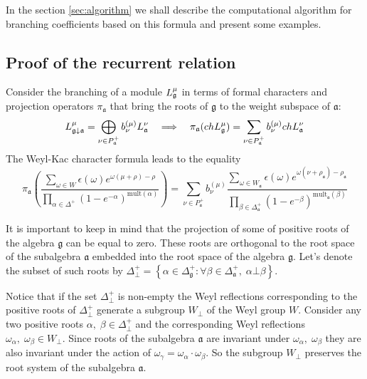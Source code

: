 \documentclass[a4paper,12pt]{article}
\theoremstyle{definition} \newtheorem{Def}{Definition}
\begin{document}
In the section \ref{sec:algorithm} we  shall describe the  computational algorithm for  branching coefficients
based on this formula and present some examples.

\subsection{Proof of the recurrent relation}
\label{sec:proof}

Consider the branching of a module $L_{\frak{g}}^{\mu }$ in terms of formal characters and
projection operators $\pi_{\mathfrak{a}}$ that bring the roots of $\mathfrak{g}$ to the
weight subspace of $\mathfrak{a}$:
\begin{equation}
  \label{eq:3}
  L_{\frak{g}\downarrow \frak{a}}^{\mu }=\bigoplus\limits_{\nu \in P_{\frak{a}%
    }^{+}}b_{\nu }^{\left( \mu \right) }L_{\frak{a}}^{\nu }\quad
  \Longrightarrow\quad
  \pi_{\mathfrak{a}}(ch L^{\mu}_{\mathfrak{g}})=
  \sum_{\nu\in P^{+}_{\mathfrak{a}}}b^{(\mu)}_{\nu} ch L^{\nu}_{\mathfrak{a}}
\end{equation}
The Weyl-Kac character formula leads to
the equality
\begin{equation}
  \label{eq:4}
  \pi_{\mathfrak{a}}\left(\frac{\sum_{\omega\in W} \epsilon(\omega) e^{\omega(\mu+\rho)-\rho}}
  {\prod_{\alpha\in\Delta^{+}}(1-e^{-\alpha})^{\mathrm{mult}(\alpha)}}\right) =
  \sum_{\nu\in P^{+}_{\mathfrak{a}}}b^{(\mu)}_{\nu}
  \frac{\sum_{\omega\in W_{\mathfrak{a}}}\epsilon(\omega)
  e^{\omega(\nu+\rho_{\mathfrak{a}})-\rho_{\mathfrak{a}}}}
  {\prod_{\beta\in \Delta_{\mathfrak{a}}^{+}}(1-e^{-\beta})^{\mathrm{mult}_{\mathfrak{a}}(\beta)}}
\end{equation}

It is important to keep in mind that the projection of some of positive roots of
the algebra $\mathfrak{g}$ can be equal to zero. These roots are orthogonal to the
root space of the subalgebra $\mathfrak{a}$ embedded into the root space of the
algebra $\mathfrak{g}$. Let's denote the subset of such roots by $\Delta^{+}_{\bot}
=\left\{\alpha\in\Delta_{\mathfrak{g}}^{+}:
\forall \beta\in \Delta_{\mathfrak{a}}^{+},\; \alpha\bot\beta \right\}$.

Notice that if the set $\Delta^{+}_{\bot}$ is non-empty the Weyl reflections
corresponding to the positive roots of $\Delta^{+}_{\bot}$ generate a subgroup
$W_{\bot}$ of the Weyl group $W$. Consider any two positive roots $\alpha,\;
\beta\in \Delta^{+}_{\bot}$ and the corresponding Weyl reflections
$\omega_{\alpha},\; \omega_{\beta}\in W_{\bot}$.  Since roots of the subalgebra
$\mathfrak{a}$ are invariant under $\omega_{\alpha}, \; \omega_{\beta}$ they
are also invariant under the action of $\omega_{\gamma}=\omega_{\alpha}\cdot \omega_{\beta}$.
So the subgroup $W_{\bot}$ preserves the root system of the subalgebra $\mathfrak{a}$.
\end{document}
